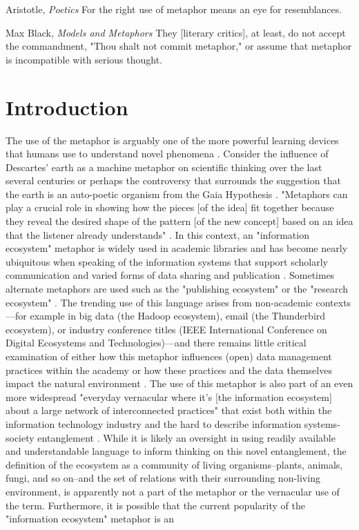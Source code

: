 

\begin{epigraph}{Aristotle, \textit{Poetics}}
For the right use of metaphor means an eye for resemblances.
\end{epigraph}
\begin{epigraph}{Max Black, \textit{Models and Metaphors}}
They [literary critics], at least, do not accept the commandment, "Thou shalt not commit metaphor," or assume that metaphor is incompatible with serious thought.
\end{epigraph}

\section{Introduction}

The use of the metaphor is arguably one of the more powerful learning devices that humans use to understand novel phenomena \citep{livingstone_198,anderson_2016}. Consider the influence of Descartes' earth as a machine metaphor on scientific thinking over the last several centuries \citep{abram_1991} or perhaps the controversy that surrounds the suggestion that the earth is an auto-poetic organism from the Gaia Hypothesis \citep{lovelock_1974}. "Metaphors can play a crucial role in showing how the pieces [of the idea] fit together because they reveal the desired shape of the pattern [of the new concept] based on an idea that the listener already understands" \citep{anderson_2016}. In this context, an "information ecosystem" metaphor is widely used in academic libraries and has become nearly ubiquitous when speaking of the information systems that support scholarly communication and varied forms of data sharing and publication \citep[for example see][]{walter_2008}. Sometimes alternate metaphors are used such as the "publishing ecosystem" or the "research ecosystem" \citep[for respective examples see][]{esposito_2013,dylla_2016}. The trending use of this language arises from non-academic contexts—for example in big data (the Hadoop ecosystem), email (the Thunderbird ecosystem), or industry conference titles (IEEE International Conference on Digital Ecosystems and Technologies)—and there remains little critical examination of either how this metaphor influences (open) data management practices within the academy or how these practices and the data themselves impact the natural environment \citep[although see][]{stepp_1999}. The use of this metaphor is also part of an even more widespread "everyday vernacular where it’s [the information ecosystem] about a large network of interconnected practices" that exist both within the information technology industry and the hard to describe information systems-society entanglement \citep{boyd_2016}. While it is likely an oversight in using readily available and understandable language to inform thinking on this novel entanglement, the definition of the ecosystem as a community of living organisms--plants, animals, fungi, and so on--and the set of relations with their surrounding non-living environment, is apparently not a part of the metaphor or the vernacular use of the term. Furthermore, it is possible that the current popularity of the "information ecosystem" metaphor is an 